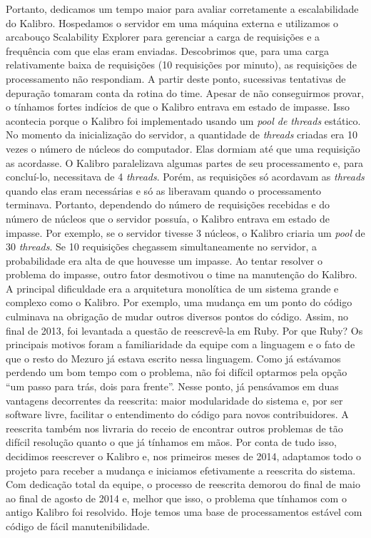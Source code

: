 \documentclass{llncs}
\begin{document}
  Portanto, dedicamos um tempo maior para avaliar corretamente a escalabilidade do Kalibro. Hospedamos o servidor em uma máquina externa e utilizamos o arcabouço Scalability Explorer \cite{moura2013automated} para gerenciar a carga de requisições e a frequência com que elas eram enviadas. Descobrimos que, para uma carga relativamente baixa de requisições (10 requisições por minuto), as requisições de processamento não respondiam. A partir deste ponto, sucessivas tentativas de depuração tomaram conta da rotina do time. Apesar de não conseguirmos provar, o tínhamos fortes indícios de que o Kalibro entrava em estado de impasse. Isso acontecia porque o Kalibro foi implementado usando um \textit{pool de threads} estático. No momento da inicialização do servidor, a quantidade de \textit{threads} criadas era 10 vezes o número de núcleos do computador. Elas dormiam até que uma requisição as acordasse. O Kalibro paralelizava algumas partes de seu processamento e, para concluí-lo, necessitava de 4 \textit{threads}. Porém, as requisições só acordavam as \textit{threads} quando elas eram necessárias e só as liberavam quando o processamento terminava. Portanto, dependendo do número de requisições recebidas e do número de núcleos que o servidor possuía, o Kalibro entrava em estado de impasse. Por exemplo, se o servidor tivesse 3 núcleos, o Kalibro criaria um \textit{pool} de 30 \textit{threads}. Se 10 requisições chegassem simultaneamente no servidor, a probabilidade era alta de que houvesse um impasse.
  Ao tentar resolver o problema do impasse, outro fator desmotivou o time na manutenção do Kalibro. A principal dificuldade era a arquitetura monolítica de um sistema grande e complexo como o Kalibro. Por exemplo, uma mudança em um ponto do código culminava na obrigação de mudar outros diversos pontos do código. Assim, no final de 2013, foi levantada a questão de reescrevê-la em Ruby. Por que Ruby? Os principais motivos foram a familiaridade da equipe com a linguagem e o fato de que o resto do Mezuro já estava escrito nessa linguagem.
  Como já estávamos perdendo um bom tempo com o problema, não foi difícil optarmos pela opção ``um passo para trás, dois para frente''. Nesse ponto, já pensávamos em duas vantagens decorrentes da reescrita: maior modularidade do sistema e, por ser software livre, facilitar o entendimento do código para novos contribuidores. A reescrita também nos livraria do receio de encontrar outros problemas de tão difícil resolução quanto o que já tínhamos em mãos. Por conta de tudo isso, decidimos reescrever o Kalibro e, nos primeiros meses de 2014, adaptamos todo o projeto para receber a mudança e iniciamos efetivamente a reescrita do sistema.
  Com dedicação total da equipe, o processo de reescrita demorou do final de maio ao final de agosto de 2014 e, melhor que isso, o problema que tínhamos com o antigo Kalibro foi resolvido. Hoje temos uma base de processamentos estável com código de fácil manutenibilidade.
\end{document}
